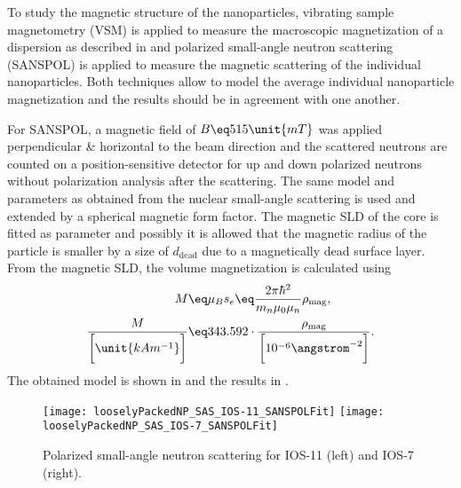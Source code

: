 \documentclass[\main/dresen_thesis.tex]{subfiles}
\begin{document}
  \label{sec:looselyPackedNS:nanoparticle:vsm}

  To study the magnetic structure of the nanoparticles, vibrating sample magnetometry (VSM) is applied to measure the macroscopic magnetization of a dispersion as described in  and polarized small-angle neutron scattering (SANSPOL) is applied to measure the magnetic scattering of the individual nanoparticles.
  Both techniques allow to model the average individual nanoparticle magnetization and the results should be in agreement with one another.

  For SANSPOL, a magnetic field of $B\eq 515 \unit{mT}$ was applied perpendicular \& horizontal to the beam direction and the scattered neutrons are counted on a position-sensitive detector for up and down polarized neutrons without polarization analysis after the scattering.
  The same model and parameters as obtained from the nuclear small-angle scattering is used and extended by a spherical magnetic form factor.
  The magnetic SLD of the core is fitted as parameter and possibly it is allowed that the magnetic radius of the particle is smaller by a size of $d_\mathrm{dead}$ due to a magnetically dead surface layer.
  From the magnetic SLD, the volume magnetization is calculated using 
  \begin{align}
    \label{eq:looselyPackedNP:nanoparticles:SLDtoMagnetization}
    M \eq& \mu_B s_e \eq \frac{2 \pi \hbar^2}{m_n \mu_0 \mu_n} \rho_\mathrm{mag},\\
    \frac{M}{\bigg[\unit{kA m^{-1}}\bigg]} \eq& 343.592 \cdot \frac{\rho_\mathrm{mag}}{\bigg[10^{-6} \angstrom^{-2} \bigg]}.
  \end{align}
  The obtained model is shown in  and the results in .

  \begin{figure}[tb]
    \centering
    \texttt{[image: looselyPackedNP\_SAS\_IOS-11\_SANSPOLFit]}
    \texttt{[image: looselyPackedNP\_SAS\_IOS-7\_SANSPOLFit]}
    \caption{\label{fig:looselyPackedNP:nanoparticle:sanspol}Polarized small-angle neutron scattering for IOS-11 (left) and IOS-7 (right).}
  \end{figure}
\end{document}

